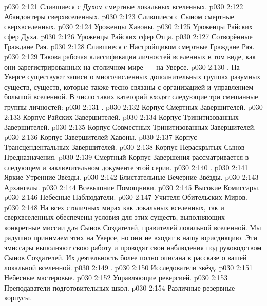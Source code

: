 \vs p030 2:121 Слившиеся с Духом смертные локальных вселенных.
\vs p030 2:122 Абандонтеры сверхвселенных.
\vs p030 2:123 Слившиеся с Сыном смертные сверхвселенных.
\vs p030 2:124 Уроженцы Хавоны.
\vs p030 2:125 Уроженцы Райских сфер Духа.
\vs p030 2:126 Уроженцы Райских сфер Отца.
\vs p030 2:127 Сотворённые Граждане Рая.
\vs p030 2:128 Слившиеся с Настройщиком смертные Граждане Рая.
\vs p030 2:129 \pc Такова рабочая классификация личностей вселенных в том виде, как они зарегистрированных на столичном мире~--- на Уверсе.
\vs p030 2:130 \pc {}. На Уверсе существуют записи о многочисленных дополнительных группах разумных существ, существ, которые также тесно связаны с организацией и управлением большой вселенной. В число таких категорий входят следующие три смешанные группы личностей:
\vs p030 2:131 .
\vs p030 2:132 Корпус Смертных Завершителей.
\vs p030 2:133 Корпус Райских Завершителей.
\vs p030 2:134 Корпус Тринитизованных Завершителей.
\vs p030 2:135 Корпус Совместных Тринитизованных Завершителей.
\vs p030 2:136 Корпус Завершителей Хавоны.
\vs p030 2:137 Корпус Трансцендентальных Завершителей.
\vs p030 2:138 Корпус Нераскрытых Сынов Предназначения.
\vs p030 2:139 \pc Смертный Корпус Завершения рассматривается в следующем и заключительном документе этой серии.
\vs p030 2:140 .
\vs p030 2:141 Яркие Утренние Звёзды.
\vs p030 2:142 Блистательные Вечерние Звёзды.
\vs p030 2:143 Архангелы.
\vs p030 2:144 Всевышние Помощники.
\vs p030 2:145 Высокие Комиссары.
\vs p030 2:146 Небесные Наблюдатели.
\vs p030 2:147 Учителя Обительских Миров.
\vs p030 2:148 \pc На всех столичных мирах как локальных вселенных, так и сверхвселенных обеспечены условия для этих существ, выполняющих конкретные миссии для Сынов Создателей, правителей локальной вселенной. Мы радушно принимаем этих  на Уверсе, но они не входят в нашу юрисдикцию. Эти эмиссары выполняют свою работу и проводят свои наблюдения под руководством Сынов Создателей. Их деятельность более полно описана в рассказе о вашей локальной вселенной.
\vs p030 2:149 .
\vs p030 2:150 Исследователи звёзд.
\vs p030 2:151 Небесные мастеровые.
\vs p030 2:152 Управляющие реверсией.
\vs p030 2:153 Преподаватели подготовительных школ.
\vs p030 2:154 Различные резервные корпусы.
